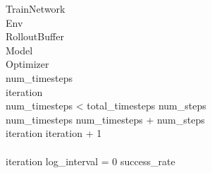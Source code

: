 \renewcommand{\thepseudonum}{\roman{pseudonum}}
\begin{pseudocode}{TrainNetwork}{ }
\label{Train}
\\

\MAIN
Env \GETS {}\\
RolloutBuffer \GETS {}\\
Model \GETS {}\\
Optimizer \GETS {}\\


num\_timesteps \\
iteration \\
\WHILE num\_timesteps < total\_timesteps \DO 
\BEGIN 
num\_steps \GETS {}\\
num\_timesteps \GETS num\_timesteps + num\_steps\\
iteration \GETS iteration + 1\\
\\
\IF iteration \mathbin{\%}  log\_interval = 0 \THEN
\BEGIN
success\_rate \GETS {}\\
\\
\END
\END\\
\ENDMAIN
\end{pseudocode}


